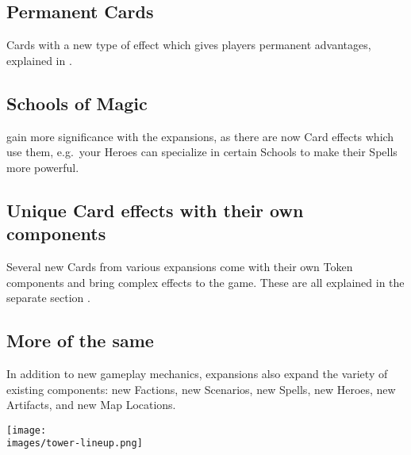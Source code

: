 \begin{multicols*}{2}
\subsection*{Permanent Cards}
Cards with a new type of effect which gives players permanent advantages, explained in .

\subsection*{Schools of Magic}
 gain more significance with the expansions, as there are now Card effects which use them, e.g.~your Heroes can specialize in certain Schools to make their Spells more powerful.

\subsection*{Unique Card effects with their own components}
Several new Cards from various expansions come with their own Token components and bring complex effects to the game.
These are all explained in the separate section .

\subsection*{More of the same}
In addition to new gameplay mechanics, expansions also expand the variety of existing components: new Factions, new Scenarios, new Spells, new Heroes, new Artifacts, and new Map Locations.

\begin{center}
    \texttt{[image: \\images/tower-lineup.png]}
\end{center}
\vspace*{\fill}
\end{multicols*}
\pagebreak

